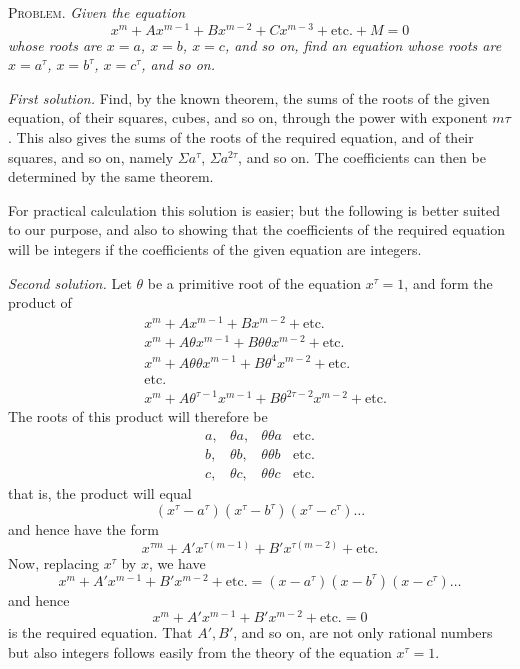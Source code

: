 \clearpage
{}
\textsc{Problem.} \emph{Given the equation}
\[
x^m+Ax^{m-1}+Bx^{m-2}+Cx^{m-3}+\text{etc.}+M=0
\]
\emph{whose roots are $x=a$, $x=b$, $x=c$, and so on, find an equation whose roots are $x=a^\tau$, $x=b^\tau$, $x=c^\tau$, and so on.}

\emph{First solution.} Find, by the known theorem, the sums of the roots of the given equation, of their squares, cubes, and so on, through the power with exponent $m\tau$. This also gives the sums of the roots of the required equation, and of their squares, and so on, namely $\Sigma a^\tau$, $\Sigma a^{2\tau}$, and so on. The coefficients can then be determined by the same theorem.

For practical calculation this solution is easier; but the following is better suited to our purpose, and also to showing that the coefficients of the required equation will be integers if the coefficients of the given equation are integers.

\emph{Second solution.} Let $\theta$ be a primitive root of the equation $x^\tau=1$, and form the product of
\[
\begin{aligned}
&x^m+Ax^{m-1}+Bx^{m-2}+\text{etc.}\\
&x^m+A\theta x^{m-1}+B\theta\theta x^{m-2}+\text{etc.}\\
&x^m+A\theta\theta x^{m-1}+B\theta^4x^{m-2}+\text{etc.}\\
&\text{etc.}\\
&x^m+A\theta^{\tau-1}x^{m-1}+B\theta^{2\tau-2}x^{m-2}+\text{etc.}
\end{aligned}
\]
The roots of this product will therefore be
\[
\begin{array}{llll}
a,&\theta a,&\theta\theta a&\text{etc.}\\
b,&\theta b,&\theta\theta b&\text{etc.}\\
c,&\theta c,&\theta\theta c&\text{etc.}
\end{array}
\]
that is, the product will equal
\[
(x^\tau-a^\tau)(x^\tau-b^\tau)(x^\tau-c^\tau)\ldots
\]
and hence have the form
\[
x^{\tau m}+A'x^{\tau(m-1)}+B'x^{\tau(m-2)}+\text{etc.}
\]
Now, replacing $x^\tau$ by $x$, we have
\[
x^m+A'x^{m-1}+B'x^{m-2}+\text{etc.}=(x-a^\tau)(x-b^\tau)(x-c^\tau)\ldots
\]
and hence
\[
x^m+A'x^{m-1}+B'x^{m-2}+\text{etc.}=0
\]
is the required equation. That $A',B'$, and so on, are not only rational numbers but also integers follows easily from the theory of the equation $x^\tau=1$.

